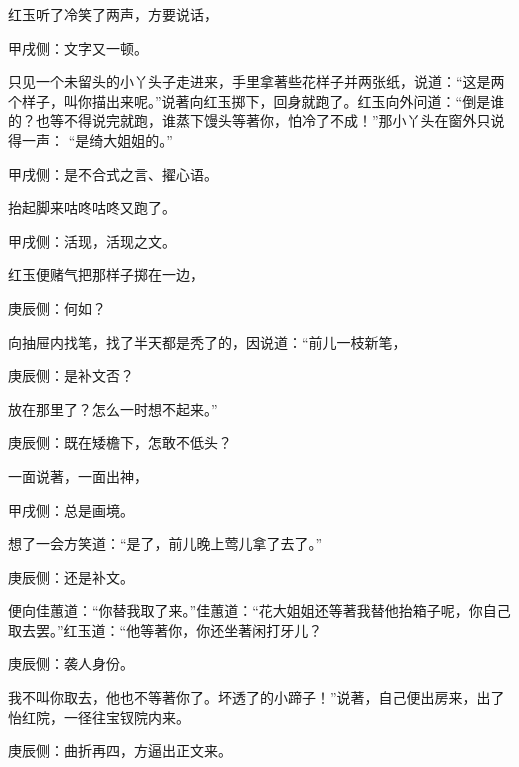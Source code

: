 \begin{parag}
    红玉听了冷笑了两声，方要说话，\begin{note}甲戌侧：文字又一顿。\end{note}只见一个未留头的小丫头子走进来，手里拿著些花样子并两张纸，说道：“这是两个样子，叫你描出来呢。”说著向红玉掷下，回身就跑了。红玉向外问道：“倒是谁的？也等不得说完就跑，谁蒸下馒头等著你，怕冷了不成！”那小丫头在窗外只说得一声： “是绮大姐姐的。”\begin{note}甲戌侧：是不合式之言、擢心语。\end{note}抬起脚来咕咚咕咚又跑了。\begin{note}甲戌侧：活现，活现之文。\end{note}红玉便赌气把那样子掷在一边，\begin{note}庚辰侧：何如？\end{note}向抽屉内找笔，找了半天都是秃了的，因说道：“前儿一枝新笔，\begin{note}庚辰侧：是补文否？\end{note}放在那里了？怎么一时想不起来。”\begin{note}庚辰侧：既在矮檐下，怎敢不低头？\end{note}一面说著，一面出神，\begin{note}甲戌侧：总是画境。\end{note}想了一会方笑道：“是了，前儿晚上莺儿拿了去了。”\begin{note}庚辰侧：还是补文。\end{note}便向佳蕙道：“你替我取了来。”佳蕙道：“花大姐姐还等著我替他抬箱子呢，你自己取去罢。”红玉道：“他等著你，你还坐著闲打牙儿？\begin{note}庚辰侧：袭人身份。\end{note}我不叫你取去，他也不等著你了。坏透了的小蹄子！”说著，自己便出房来，出了怡红院，一径往宝钗院内来。\begin{note}庚辰侧：曲折再四，方逼出正文来。\end{note}
\end{parag}


